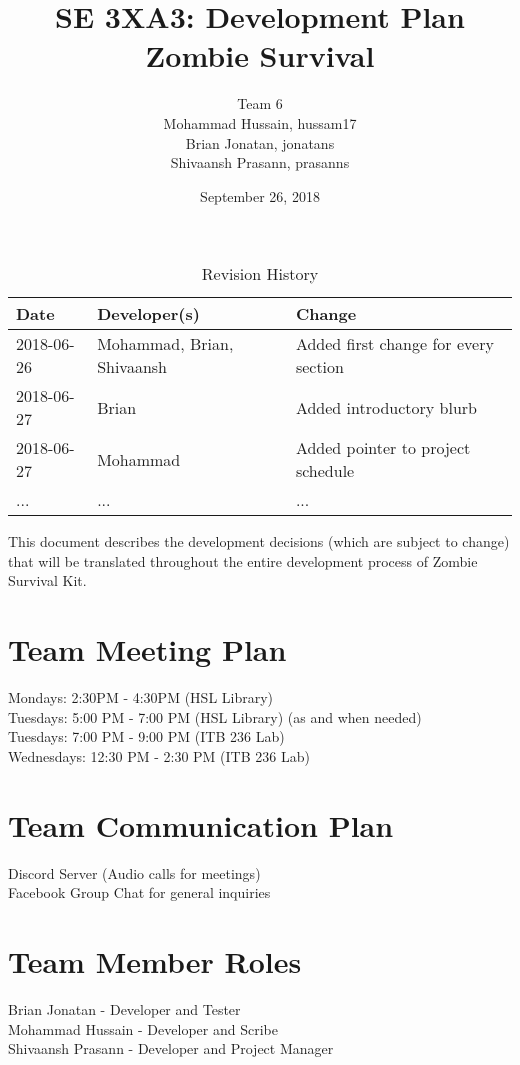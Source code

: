 \documentclass{article}
\title{SE 3XA3: Development Plan\\Zombie Survival}
\author{Team 6
		\\ Mohammad Hussain, hussam17
		\\ Brian Jonatan,  jonatans
		\\ Shivaansh Prasann, prasanns
}
\date{September 26, 2018}
\begin{document}
\begin{table}[hp]
\caption{Revision History} \label{TblRevisionHistory}
\begin{tabularx}{\textwidth}{llX}
\toprule
\textbf{Date} & \textbf{Developer(s)} & \textbf{Change}\\
\midrule
2018-06-26 & Mohammad, Brian, Shivaansh & Added first change for every section\\
2018-06-27 & Brian & Added introductory blurb\\
2018-06-27 & Mohammad & Added pointer to project schedule\\
... & ... & ...\\
\bottomrule
\end{tabularx}
\end{table}

\newpage

\maketitle

This document describes the development decisions (which are subject to change) that will be translated throughout the entire development process of Zombie Survival Kit.

\section{Team Meeting Plan}
Mondays: 2:30PM - 4:30PM (HSL Library)\\
Tuesdays: 5:00 PM - 7:00 PM (HSL Library) (as and when needed)\\
Tuesdays: 7:00 PM - 9:00 PM (ITB 236 Lab)\\
Wednesdays: 12:30 PM - 2:30 PM (ITB 236 Lab)

\section{Team Communication Plan}
Discord Server (Audio calls for meetings)\\
Facebook Group Chat for general inquiries

\section{Team Member Roles}
Brian Jonatan - Developer and Tester\\
Mohammad Hussain - Developer and Scribe\\
Shivaansh Prasann - Developer and Project Manager
\end{document}
